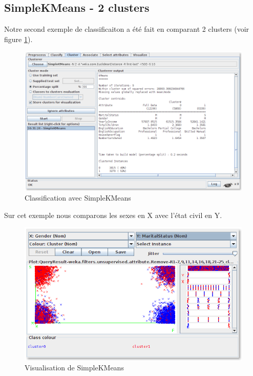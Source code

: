 \subsection*{SimpleKMeans - 2 clusters}
    
    Notre second exemple de classificaiton a été fait en comparant 2 clusters (voir figure \ref{kmeans2}).

    \begin{figure}[H]
        \centering
        \includegraphics[width=1\linewidth, fbox]{img/clustering/kmeans_2.png}
        \caption{Classification avec SimpleKMeans}
        \label{kmeans2}
    \end{figure}

    Sur cet exemple nous comparons les sexes en X avec l'état civil en Y.

    \begin{figure}[H]
        \centering
        \includegraphics[width=1\linewidth, fbox]{img/clustering/kmeans_2_viz.png}
        \caption{Visualisation de SimpleKMeans}
        \label{kmeans2viz}
    \end{figure}

